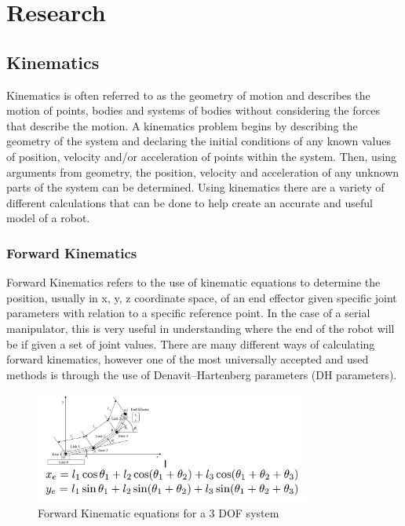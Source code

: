\graphicspath{ {./figures/} }
\section{Research}
\subsection{Kinematics}
 Kinematics is  often referred to as the geometry of motion and describes the motion of points, bodies and systems of bodies without considering the forces that describe the motion. A kinematics problem begins by describing the geometry of the system and declaring the initial conditions of any known values of position, velocity and/or acceleration of points within the system. Then, using arguments from geometry, the position, velocity and acceleration of any unknown parts of the system can be determined. Using kinematics there are a variety of different calculations that can be done to help create an accurate and useful model of a robot. 
    \subsubsection{Forward Kinematics}
    Forward Kinematics refers to the use of kinematic equations to determine the position, usually in x, y, z coordinate space, of an end effector given specific joint parameters with relation to a specific reference point. In the case of a serial manipulator, this is very useful in understanding where the end of the robot will be if given a set of joint values. There are many different ways of calculating forward kinematics, however one of the most universally accepted and used methods is through the use of Denavit–Hartenberg parameters (DH parameters).
    \begin{figure}[H]
        \centering
        \includegraphics[width=0.8\textwidth]{3dof.PNG}
        \caption{Forward Kinematic equations for a 3 DOF system}
        \label{fig:my_label}
    \end{figure}
